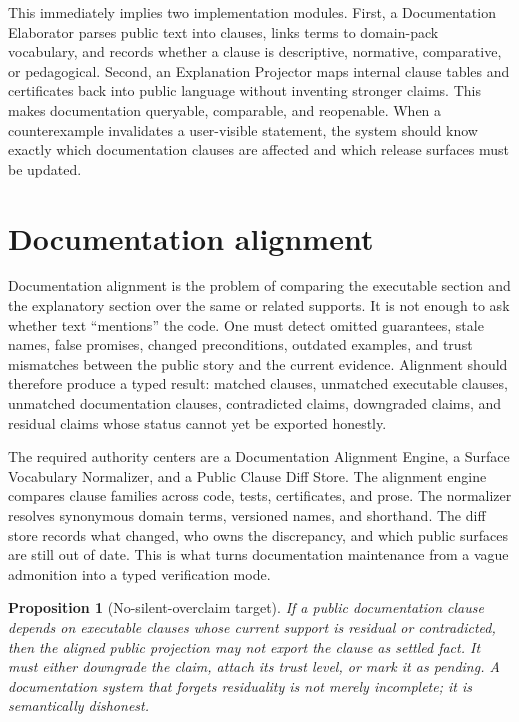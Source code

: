 \documentclass[11pt]{report}
\newtheorem{proposition}[definition]{Proposition}
\begin{document}
This immediately implies two implementation modules. First, a Documentation Elaborator parses public text into clauses, links terms to domain-pack vocabulary, and records whether a clause is descriptive, normative, comparative, or pedagogical. Second, an Explanation Projector maps internal clause tables and certificates back into public language without inventing stronger claims. This makes documentation queryable, comparable, and reopenable. When a counterexample invalidates a user-visible statement, the system should know exactly which documentation clauses are affected and which release surfaces must be updated.
\section{Documentation alignment}
Documentation alignment is the problem of comparing the executable section and the explanatory section over the same or related supports. It is not enough to ask whether text ``mentions'' the code. One must detect omitted guarantees, stale names, false promises, changed preconditions, outdated examples, and trust mismatches between the public story and the current evidence. Alignment should therefore produce a typed result: matched clauses, unmatched executable clauses, unmatched documentation clauses, contradicted claims, downgraded claims, and residual claims whose status cannot yet be exported honestly.

The required authority centers are a Documentation Alignment Engine, a Surface Vocabulary Normalizer, and a Public Clause Diff Store. The alignment engine compares clause families across code, tests, certificates, and prose. The normalizer resolves synonymous domain terms, versioned names, and shorthand. The diff store records what changed, who owns the discrepancy, and which public surfaces are still out of date. This is what turns documentation maintenance from a vague admonition into a typed verification mode.

\begin{proposition}[No-silent-overclaim target]
If a public documentation clause depends on executable clauses whose current support is residual or contradicted, then the aligned public projection may not export the clause as settled fact. It must either downgrade the claim, attach its trust level, or mark it as pending. A documentation system that forgets residuality is not merely incomplete; it is semantically dishonest.
\end{proposition}
\end{document}
